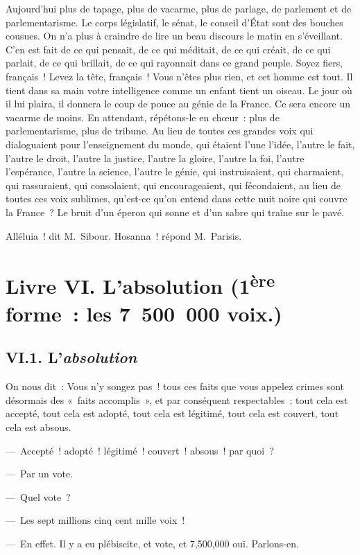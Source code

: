 \documentclass[french,twoside]{book} %
\newcommand\chapteropen{} %
\newcommand\chaptercont{} %
\newcommand\chapterclose{} %
\begin{document}
Aujourd’hui plus de tapage, plus de vacarme, plus de parlage, de parlement et de parlementarisme. Le corps législatif, le sénat, le conseil d’État sont des bouches cousues. On n’a plus à craindre de lire un beau discours le matin en s’éveillant. C’en est fait de ce qui pensait, de ce qui méditait, de ce qui créait, de ce qui parlait, de ce qui brillait, de ce qui rayonnait dans ce grand peuple. Soyez fiers, français ! Levez la tête, français ! Vous n’êtes plus rien, et cet homme est tout. Il tient dans sa main votre intelligence comme un enfant tient un oiseau. Le jour où il lui plaira, il donnera le coup de pouce au génie de la France. Ce sera encore un vacarme de moins. En attendant, répétons-le en chœur : plus de parlementarisme, plus de tribune. Au lieu de toutes ces grandes voix qui dialoguaient pour l’enseignement du monde, qui étaient l’une l’idée, l’autre le fait, l’autre le droit, l’autre la justice, l’autre la gloire, l’autre la foi, l’autre l’espérance, l’autre la science, l’autre le génie, qui instruisaient, qui charmaient, qui rassuraient, qui consolaient, qui encourageaient, qui fécondaient, au lieu de toutes ces voix sublimes, qu’est-ce qu’on entend dans cette nuit noire qui couvre la France ? Le bruit d’un éperon qui sonne et d’un sabre qui traîne sur le pavé.\par
Alléluia ! dit M. Sibour. Hosanna ! répond M. Parisis.
\chapterclose


\chapteropen

\chapter[{Livre VI. L’absolution (1ère forme : les 7 500 000 voix.)}]{Livre VI. L’absolution (1\textsuperscript{ère} forme : les 7 500 000 voix.)}
\renewcommand{\leftmark}{Livre VI. L’absolution (1\textsuperscript{ère} forme : les 7 500 000 voix.)}


\chaptercont

\section[{VI.1. L’absolution}]{VI.1. L’\emph{absolution}}

\noindent On nous dit : Vous n’y songez pas ! tous ces faits que vous appelez crimes sont désormais des « faits accomplis », et par conséquent respectables ; tout cela est accepté, tout cela est adopté, tout cela est légitimé, tout cela est couvert, tout cela est absous.\par
— Accepté ! adopté ! légitimé ! couvert ! absous ! par quoi ?\par
— Par un vote.\par
— Quel vote ?\par
— Les sept millions cinq cent mille voix !\par
— En effet. Il y a eu plébiscite, et vote, et 7,500,000 oui. Parlons-en.
\end{document}
